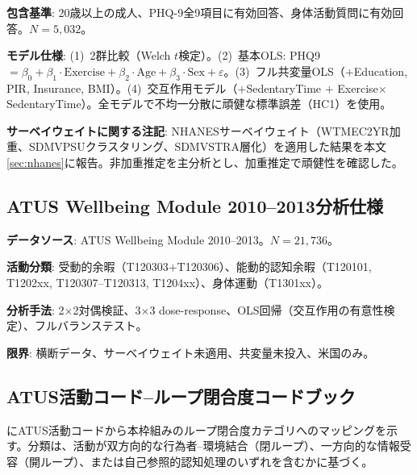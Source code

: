 \documentclass[a4paper,11pt,titlepage]{article}
\begin{document}
\textbf{包含基準}: 20歳以上の成人、PHQ-9全9項目に有効回答、身体活動質問に有効回答。$N = 5{,}032$。

\textbf{モデル仕様}: (1)~2群比較（Welch $t$検定）。(2)~基本OLS: PHQ9 $= \beta_0 + \beta_1 \cdot \text{Exercise} + \beta_2 \cdot \text{Age} + \beta_3 \cdot \text{Sex} + \varepsilon$。(3)~フル共変量OLS（$+$Education, PIR, Insurance, BMI）。(4)~交互作用モデル（$+$SedentaryTime $+$ Exercise$\times$SedentaryTime）。全モデルで不均一分散に頑健な標準誤差（HC1）を使用。

\textbf{サーベイウェイトに関する注記}: NHANESサーベイウェイト（WTMEC2YR加重、SDMVPSUクラスタリング、SDMVSTRA層化）を適用した結果を本文\cref{sec:nhanes}に報告。非加重推定を主分析とし、加重推定で頑健性を確認した。

\subsection{ATUS Wellbeing Module 2010--2013分析仕様}\label{app:atus-spec}

\textbf{データソース}: ATUS Wellbeing Module 2010--2013。$N = 21{,}736$。

\textbf{活動分類}: 受動的余暇（T120303$+$T120306）、能動的認知余暇（T120101, T1202xx, T120307--T120313, T1204xx）、身体運動（T1301xx）。

\textbf{分析手法}: 2$\times$2対偶検証、3$\times$3 dose-response、OLS回帰（交互作用の有意性検定）、フルバランステスト。

\textbf{限界}: 横断データ、サーベイウェイト未適用、共変量未投入、米国のみ。

\subsection{ATUS活動コード--ループ閉合度コードブック}\label{app:codebook}

にATUS活動コードから本枠組みのループ閉合度カテゴリへのマッピングを示す。分類は、活動が双方向的な行為者--環境結合（閉ループ）、一方向的な情報受容（開ループ）、または自己参照的認知処理のいずれを含むかに基づく。
\end{document}
